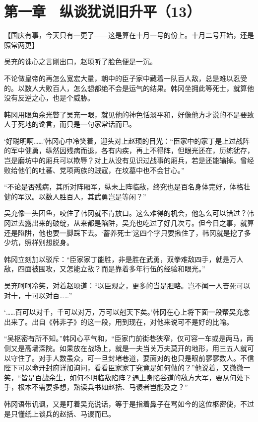 \section{第一章　纵谈犹说旧升平（13）}

【国庆有事，今天只有一更了——这是算在十月一号的份上。十月二号开始，还是照常两更】

吴充的诛心之言刚出口，赵顼听了脸色便是一沉。

不论做皇帝的再怎么宽宏大量，朝中的臣子家中藏着一队百人敌，总是难以忍受的。以数人大败百人，怎么想都绝不会是运气的结果。韩冈坐拥此等死士，就算他没有反逆之心，也是个威胁。

韩冈用眼角余光瞥了吴充一眼，就见他的神色恬淡平和，好像他方才说的不是要致人于死地的谗言，而只是一句家常话而已。

‘好聪明啊……’韩冈心中冷笑着，迎头对上赵顼的目光：“臣家中的家丁是上过战阵的军中健勇，纵然因残病而退，各有内疾，再上不得阵，但眼光还在，历练犹存，岂是磨坊中的厢兵可以欺辱？对上从没有见识过战事的厢兵，若是还能输掉。曾经败给他们的吐蕃、党项两族的贼寇，在坟墓中也不会甘心。”

“不论是否残病，其所对阵厢军，纵未上阵临敌，终究也是百名身体完好，体格壮健的军汉。以数人胜百人，其武勇岂是等闲？”

吴充像一头团鱼，咬住了韩冈就不肯放口。这么难得的机会，他怎么可以错过？韩冈过去露出来的破绽，从来都是陷阱，吴充也吃过了好几次亏。但今日之事，就算还是陷阱，他也要一脚踩下去。‘蓄养死士’这四个字只要揪住了，韩冈就是挖了多少坑，照样别想脱身。

韩冈立刻加以驳斥：“臣家家丁能胜，非是胜在武勇，双拳难敌四手，就是万人敌，四面被围攻，又怎能立敌？而是靠着多年行伍的经验和眼光。”

吴充呵呵冷笑，对着赵顼道：“以臣观之，更多的当是胆略。岂不闻一人奋死可以对十，十可以对百……”

‘……百可以对千，千可以对万，万可以尅天下矣。’韩冈在心上将下面一段帮吴充念出来了。出自《韩非子》的这一段，用到现在，对他来说可不是好的比喻。

“吴枢密有所不知。”韩冈心平气和，“臣家门前街巷狭窄，仅可容一车或是两马，两侧又是高墙深院。如果放在战场上，就是一夫当关万夫莫开的地形，用三五人就可以守住了。对手人数虽众，可一旦封堵巷道，要面对的也只是眼前寥寥数人。不信陛下可以命开封府详加询问，看看臣家家丁究竟是如何做的？”他说着，又微微一笑，“皆是百战余生，如何不明临敌陷阵？遇上身陷谷道的敌方大军，要从何处下手，根本不需要多想，熟读兵书如赵括、马谡者岂能及之？”

韩冈语带讥讽，又是盯着吴充说话，等于是指着鼻子在骂如今的这位枢密使，不过是只懂纸上谈兵的赵括、马谡而已。

